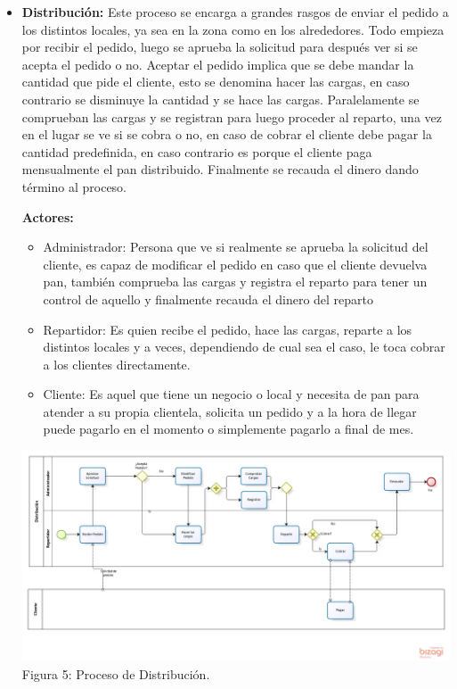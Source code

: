 \begin{itemize}
\item \textbf{Distribución:} Este proceso se encarga a grandes rasgos de enviar el pedido a los distintos locales, ya sea en la zona como en los alrededores. Todo empieza por recibir el pedido, luego se aprueba la solicitud para después ver si se acepta el pedido o no. Aceptar el pedido implica que se debe mandar la cantidad que pide el cliente, esto se denomina hacer las cargas, en caso contrario se disminuye la cantidad y se hace las cargas. Paralelamente se comprueban las cargas y se registran para luego proceder al reparto, una vez en el lugar se ve si se cobra o no, en caso de cobrar el cliente debe pagar la cantidad predefinida, en caso contrario es porque el cliente paga mensualmente el pan distribuido. Finalmente se recauda el dinero dando término al proceso.

\textbf{Actores:} 
\begin{itemize}
\item Administrador: Persona que ve si realmente se aprueba la solicitud del cliente, es capaz de modificar el pedido en caso que el cliente devuelva pan, también comprueba las cargas y registra el reparto para tener un control de aquello y finalmente recauda el dinero del reparto
\item Repartidor: Es quien recibe el pedido, hace las cargas, reparte a los distintos locales y a veces, dependiendo de cual sea el caso, le toca cobrar a los clientes directamente.
\item Cliente: Es aquel que tiene un negocio o local y necesita de pan para atender a su propia clientela, solicita un pedido y a la hora de llegar puede pagarlo en el momento o simplemente pagarlo a final de mes.
\end{itemize}

\begin{center}
\includegraphics[width=15cm]{./imagenes/Distribucion.png}\\
Figura 5: Proceso de Distribución.
\end{center}


\end{itemize}
